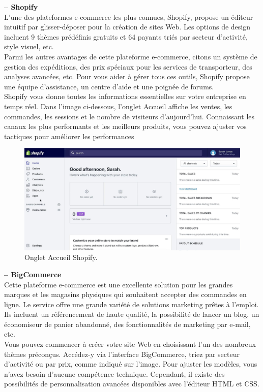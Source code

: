 \documentclass[a4paper, 12pt]{report}
\begin{document}
\textbf{-- Shopify}\\
L'une des plateformes e-commerce les plus connues, Shopify, propose un éditeur intuitif par glisser-déposer pour la création de sites Web. Les options de design incluent 9 thèmes prédéfinis gratuits et 64 payants triés par secteur d'activité, style visuel, etc.\\
Parmi les autres avantages de cette plateforme e-commerce, citons un système de gestion des expéditions, des prix spéciaux pour les services de transporteur, des analyses avancées, etc. Pour vous aider à gérer tous ces outils, Shopify propose une équipe d'assistance, un centre d'aide et une poignée de forums.\\
Shopify vous donne toutes les informations essentielles sur votre entreprise en temps réel. Dans l'image ci-dessous, l'onglet Accueil affiche les ventes, les commandes, les sessions et le nombre de visiteurs d'aujourd'hui. Connaissant les canaux les plus performants et les meilleurs produits, vous pouvez ajuster vos tactiques pour améliorer les performances


\begin{figure}[H]
    \centering
    \includegraphics[width = 1\linewidth]{img/o.png}
    \caption{Onglet Accueil Shopify.}
\end{figure}

\textbf{-- BigCommerce}\\
Cette plateforme e-commerce est une excellente solution pour les grandes marques et les magasins physiques qui souhaitent accepter des commandes en ligne. Le service offre une grande variété de solutions marketing prêtes à l'emploi. Ils incluent un référencement de haute qualité, la possibilité de lancer un blog, un économiseur de panier abandonné, des fonctionnalités de marketing par e-mail, etc.\\

Vous pouvez commencer à créer votre site Web en choisissant l'un des nombreux thèmes préconçus. Accédez-y via l'interface BigCommerce, triez par secteur d'activité ou par prix, comme indiqué sur l'image. Pour ajuster les modèles, vous n'avez besoin d'aucune compétence technique. Cependant, il existe des possibilités de personnalisation avancées disponibles avec l'éditeur HTML et CSS.
\end{document}
